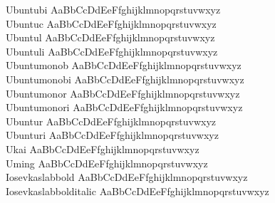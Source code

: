 \begin{tabbing}
Ubuntubi \> { AaBbCcDdEeFfghijklmnopqrstuvwxyz} \\
Ubuntuc \> { AaBbCcDdEeFfghijklmnopqrstuvwxyz} \\
Ubuntul \> { AaBbCcDdEeFfghijklmnopqrstuvwxyz} \\
Ubuntuli \> { AaBbCcDdEeFfghijklmnopqrstuvwxyz} \\
Ubuntumonob \> { AaBbCcDdEeFfghijklmnopqrstuvwxyz} \\
Ubuntumonobi \> { AaBbCcDdEeFfghijklmnopqrstuvwxyz} \\
Ubuntumonor \> { AaBbCcDdEeFfghijklmnopqrstuvwxyz} \\
Ubuntumonori \> { AaBbCcDdEeFfghijklmnopqrstuvwxyz} \\
Ubuntur \> { AaBbCcDdEeFfghijklmnopqrstuvwxyz} \\
Ubunturi \> { AaBbCcDdEeFfghijklmnopqrstuvwxyz} \\
Ukai \> { AaBbCcDdEeFfghijklmnopqrstuvwxyz} \\
Uming \> { AaBbCcDdEeFfghijklmnopqrstuvwxyz} \\
Iosevkaslabbold \> { AaBbCcDdEeFfghijklmnopqrstuvwxyz} \\
Iosevkaslabbolditalic \> { AaBbCcDdEeFfghijklmnopqrstuvwxyz} \\

\end{tabbing}
